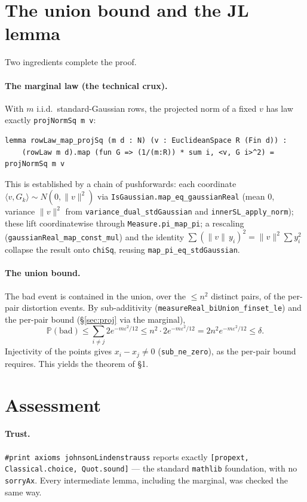 \documentclass[11pt]{article}
\theoremstyle{remark}
\newcommand{\Prob}{\mathbb{P}}
\newcommand{\eps}{\varepsilon}
\newcommand{\norm}[1]{\lVert #1 \rVert}
\begin{document}
\section{The union bound and the JL lemma}\label{sec:union}

Two ingredients complete the proof.

\paragraph{The marginal law (the technical crux).} With $m$ i.i.d.\ standard-Gaussian
rows, the projected norm of a fixed $v$ has law exactly \texttt{projNormSq m v}:
\begin{lstlisting}
lemma rowLaw_map_projSq (m d : N) (v : EuclideanSpace R (Fin d)) :
    (rowLaw m d).map (fun G => (1/(m:R)) * sum i, <v, G i>^2) = projNormSq m v
\end{lstlisting}
This is established by a chain of pushforwards: each coordinate
$\langle v,G_k\rangle\sim N(0,\norm v^2)$ via
\texttt{IsGaussian.map\_eq\_gaussianReal} (mean $0$, variance $\norm v^2$ from
\texttt{variance\_dual\_stdGaussian} and \texttt{innerSL\_apply\_norm}); these lift
coordinatewise through \texttt{Measure.pi\_map\_pi}; a rescaling
(\texttt{gaussianReal\_map\_const\_mul}) and the identity $\sum(\norm v\,y_i)^2=\norm
v^2\sum y_i^2$ collapse the result onto \texttt{chiSq}, reusing
\texttt{map\_pi\_eq\_stdGaussian}.

\paragraph{The union bound.} The bad event is contained in the union, over the $\le n^2$
distinct pairs, of the per-pair distortion events. By sub-additivity
(\texttt{measureReal\_biUnion\_finset\_le}) and the per-pair bound (\S\ref{sec:proj} via
the marginal),
\[
  \Prob(\text{bad}) \le \sum_{i\ne j} 2e^{-m\eps^2/12} \le n^2\cdot2e^{-m\eps^2/12}
  = 2n^2 e^{-m\eps^2/12} \le \delta.
\]
Injectivity of the points gives $x_i-x_j\ne0$ (\texttt{sub\_ne\_zero}), as the per-pair
bound requires. This yields the theorem of \S1.

\section{Assessment}

\paragraph{Trust.} \texttt{\#print axioms johnsonLindenstrauss} reports exactly
\texttt{[propext, Classical.choice, Quot.sound]} --- the standard \texttt{mathlib}
foundation, with no \texttt{sorryAx}. Every intermediate lemma, including the marginal,
was checked the same way.
\end{document}
